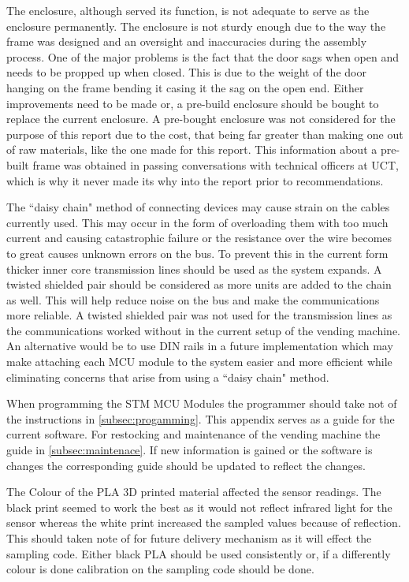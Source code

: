 \documentclass[a4paper,11pt]{article}
\numberwithin{figure}{section}
\numberwithin{table}{section}
\begin{document}
The enclosure, although served its function, is not adequate to serve as the enclosure permanently. The enclosure is not sturdy enough due to the way the frame was designed and an oversight and inaccuracies during the assembly process. One of the major problems is the fact that the door sags when open and needs to be propped up when closed. This is due to the weight of the door hanging on the frame bending it casing it the sag on the open end. Either improvements need to be made or, a pre-build enclosure should be bought to replace the current enclosure. A pre-bought enclosure was not considered for the purpose of this report due to the cost, that being far greater than making one out of raw materials, like the one made for this report. This information about a pre-built frame was obtained in passing conversations with technical officers at UCT, which is why it never made its why into the report prior to recommendations.

The ``daisy chain" method of connecting devices may cause strain on the cables currently used. This may occur in the form of overloading them with too much current and causing catastrophic failure or the resistance over the wire becomes to great causes unknown errors on the bus. To prevent this in the current form thicker inner core transmission lines should be used as the system expands. A twisted shielded pair should be considered as more units are added to the chain as well. This will help reduce noise on the bus and make the communications more reliable. A twisted shielded pair was not used for the transmission lines as the communications worked without in the current setup of the vending machine. An alternative would be to use DIN rails in a future implementation which may make attaching each MCU module to the system easier and more efficient while eliminating concerns that arise from using a ``daisy chain" method.

When programming the STM MCU Modules the programmer should take not of the instructions in \autoref{subsec:progamming}. This appendix serves as a guide for the current software. For restocking and maintenance of the vending machine the guide in \autoref{subsec:maintenace}. If new information is gained or the software is changes the corresponding guide should be updated to reflect the changes.

The Colour of the PLA 3D printed material affected the sensor readings. The black print seemed to work the best as it would not reflect infrared light for the sensor whereas the white print increased the sampled values because of reflection. This should taken note of for future delivery mechanism as it will effect the sampling code. Either black PLA should be used consistently or, if a differently colour is done calibration on the sampling code should be done.
\end{document}
